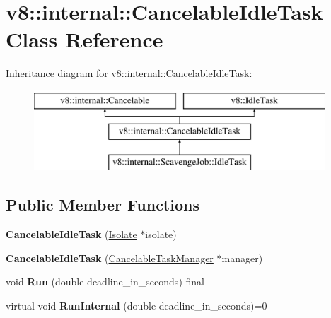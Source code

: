 \hypertarget{classv8_1_1internal_1_1CancelableIdleTask}{}\section{v8\+:\+:internal\+:\+:Cancelable\+Idle\+Task Class Reference}
\label{classv8_1_1internal_1_1CancelableIdleTask}
Inheritance diagram for v8\+:\+:internal\+:\+:Cancelable\+Idle\+Task\+:\begin{figure}[H]
\begin{center}
\leavevmode
\includegraphics[height=3.000000cm]{classv8_1_1internal_1_1CancelableIdleTask}
\end{center}
\end{figure}
\subsection*{Public Member Functions}
\begin{DoxyCompactItemize}
\item 
\mbox{\label{classv8_1_1internal_1_1CancelableIdleTask_acbb0dedd9f04f088645791a17caa264c}} 
{\bfseries Cancelable\+Idle\+Task} (\mbox{\hyperlink{classv8_1_1internal_1_1Isolate}{Isolate}} $\ast$isolate)
\item 
\mbox{\label{classv8_1_1internal_1_1CancelableIdleTask_a0f8fa3dca6071a865ebee46e90ddefb4}} 
{\bfseries Cancelable\+Idle\+Task} (\mbox{\hyperlink{classv8_1_1internal_1_1CancelableTaskManager}{Cancelable\+Task\+Manager}} $\ast$manager)
\item 
\mbox{\label{classv8_1_1internal_1_1CancelableIdleTask_aff0b5c4a4de191ea68a38bb38e238275}} 
void {\bfseries Run} (double deadline\+\_\+in\+\_\+seconds) final
\item 
\mbox{\label{classv8_1_1internal_1_1CancelableIdleTask_a7f00974650eae0763c79a6aef2a73ab5}} 
virtual void {\bfseries Run\+Internal} (double deadline\+\_\+in\+\_\+seconds)=0
\end{DoxyCompactItemize}
